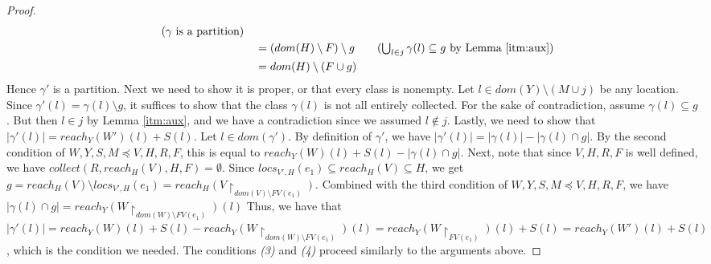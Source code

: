 \documentclass{easychair}
\theoremstyle{definition}
\begin{document}
\begin{proof}
\begin{align*}
			\tag{$\gamma$ is a partition}\\
		&\quad = (dom(H) \setminus F) \setminus g 
			\tag{$\bigcup_{l \in j} \gamma(l) \subseteq g$ by Lemma \ref{itm:aux}}\\
		&\quad = dom(H) \setminus (F \cup g)
  \end{align*}
  Hence $\gamma'$ is a partition. Next we need to show it is proper, or that 
  every class is nonempty.
  Let $l \in dom(Y) \setminus (M \cup j)$ be any location. Since 
  $\gamma'(l) = \gamma(l) \setminus g$, it suffices to show 
  that the class $\gamma(l)$ is not all entirely collected. For the sake of contradiction, assume 
  $\gamma(l) \subseteq g$. But then $l \in j$ by Lemma \ref{itm:aux}, and 
  we have a contradiction since we assumed $l \notin j$.  
  Lastly, we need to show that $|\gamma'(l)| = reach_{Y}(W')(l) + S(l)$.
	Let $l \in dom(\gamma')$. By definition of $\gamma'$, we have 
  $|\gamma'(l)| = |\gamma(l)| - |\gamma(l) \cap g|$. By 
  the second condition of $W,Y,S,M\preceq V,H,R,F$, 
  this is equal to $reach_Y(W)(l) + S(l) - |\gamma(l) \cap g|$. Next, note that
  since $V,H,R,F$ is well defined, we have $collect(R,reach_H(V),H,F) = \emptyset$.
  Since $locs_{V',H}(e_1) \subseteq reach_H(V) \subseteq H$, we get 
  $g = reach_H(V) \setminus locs_{V',H}(e_1) = reach_H(V\restriction_{dom(V) \setminus FV(e_1)})$.
  Combined with the 
  third condition of  $W,Y,S,M\preceq V,H,R,F$, we have
  $|\gamma(l) \cap g| = reach_Y(W\restriction_{dom(W)\setminus FV(e_1)})(l)$
	Thus, we have that $|\gamma'(l)| = 
  reach_Y(W)(l) + S(l) - reach_Y(W\restriction_{dom(W)\setminus FV(e_1)})(l) =
  reach_Y(W\restriction_{FV(e_1)})(l) +  S(l) = reach_Y(W')(l) +  S(l)$, which is
  the condition we needed. The conditions \emph{(3)} and \emph{(4)} proceed similarly
  to the arguments above.


\end{proof}
\end{document}
